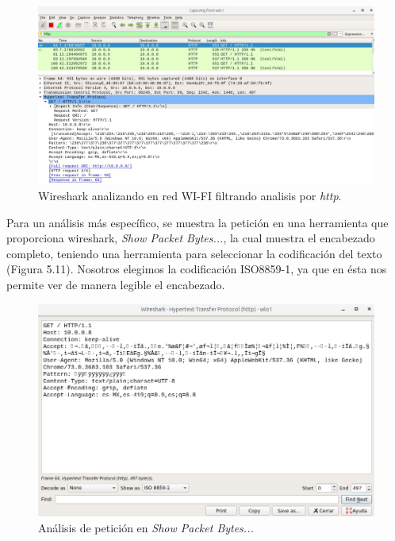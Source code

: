 \documentclass[12pt, a4paper, titlepage]{report}
\begin{document}
            \begin{figure}[H]
        		\begin{center}	\includegraphics[width=13cm]{./imagenes/Pruebas/Prototipo_2/wiresharkFull.jpeg}
        			\caption{Wireshark analizando en red WI-FI filtrando analisis por \textit{http}.}
        		\end{center}
        	\end{figure}
	
        	Para un análisis más específico, se muestra la petición en una herramienta que proporciona wireshark, \textit{Show Packet Bytes...}, la cual muestra el encabezado completo, teniendo una herramienta para seleccionar la codificación del texto (Figura 5.11). Nosotros elegimos la codificación ISO8859-1, ya que en ésta nos permite ver de manera legible el encabezado.
	
        	\begin{figure}[H]
        		\begin{center}	\includegraphics[width=13cm]{./imagenes/Pruebas/Prototipo_2/wiresharkFrame_ISO_header.jpeg}
        			\caption{Análisis de petición en \textit{Show Packet Bytes...}}
        		\end{center}
        	\end{figure}
        	
\end{document}

